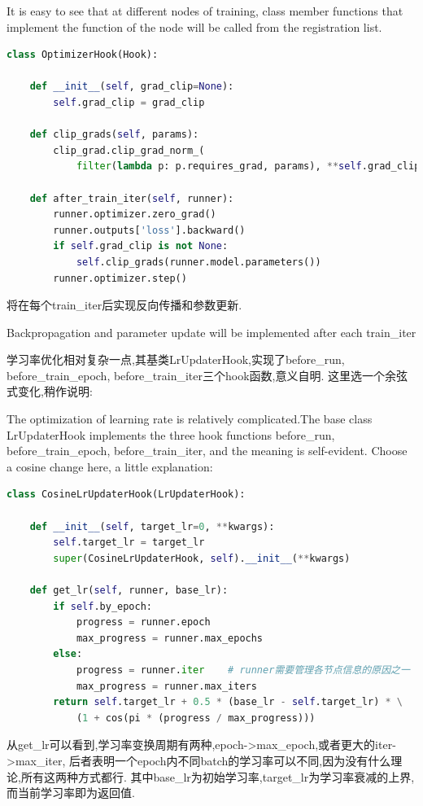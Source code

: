 \documentclass[UTF8]{ctexart}
\begin{document}
It is easy to see that at different nodes of training, class member 
functions that implement the function of the node will be called from the registration list.

\lstset{style=mystyle}
\begin{lstlisting}[language=Python]
class OptimizerHook(Hook):

    def __init__(self, grad_clip=None):
        self.grad_clip = grad_clip

    def clip_grads(self, params):
        clip_grad.clip_grad_norm_(
            filter(lambda p: p.requires_grad, params), **self.grad_clip)

    def after_train_iter(self, runner):
        runner.optimizer.zero_grad()
        runner.outputs['loss'].backward()
        if self.grad_clip is not None:
            self.clip_grads(runner.model.parameters())
        runner.optimizer.step()
\end{lstlisting}
将在每个train\_iter后实现反向传播和参数更新.

Backpropagation and parameter update will be implemented after each train\_iter

学习率优化相对复杂一点,其基类LrUpdaterHook,实现了before\_run, before\_train\_epoch, before\_train\_iter三个hook函数,意义自明.
这里选一个余弦式变化,稍作说明:

The optimization of learning rate is relatively complicated.The base class LrUpdaterHook implements the 
three hook functions before\_run, before\_train\_epoch, before\_train\_iter, and the meaning is self-evident.
Choose a cosine change here, a little explanation:

\lstset{style=mystyle}
\begin{lstlisting}[language=Python]
class CosineLrUpdaterHook(LrUpdaterHook):

    def __init__(self, target_lr=0, **kwargs):
        self.target_lr = target_lr
        super(CosineLrUpdaterHook, self).__init__(**kwargs)

    def get_lr(self, runner, base_lr):
        if self.by_epoch:
            progress = runner.epoch
            max_progress = runner.max_epochs
        else:
            progress = runner.iter    # runner需要管理各节点信息的原因之一
            max_progress = runner.max_iters
        return self.target_lr + 0.5 * (base_lr - self.target_lr) * \
			(1 + cos(pi * (progress / max_progress)))
\end{lstlisting}
从get\_lr可以看到,学习率变换周期有两种,epoch->max\_epoch,或者更大的iter->max\_iter,
后者表明一个epoch内不同batch的学习率可以不同,因为没有什么理论,所有这两种方式都行.
其中base\_lr为初始学习率,target\_lr为学习率衰减的上界,而当前学习率即为返回值.
\end{document}
